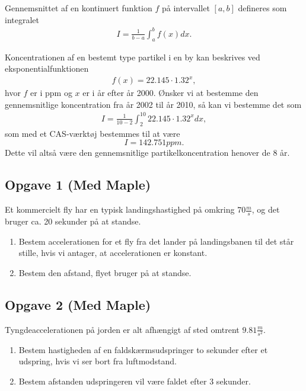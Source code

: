 \begin{defn}
Gennemsnittet af en kontinuert funktion $f$ på intervallet $[a,b]$ defineres som integralet
\begin{align*}
I = \frac{1}{b-a}\int_a^bf(x)dx.
\end{align*}
\end{defn}

\begin{exa}
Koncentrationen af en bestemt type partikel i en by kan beskrives ved eksponentialfunktionen
\begin{align*}
f(x) = 22.145\cdot 1.32^x,
\end{align*}
hvor $f$ er i ppm og $x$ er i år efter år 2000. Ønsker vi at bestemme den gennemsnitlige koncentration fra år 2002 til år 2010, så kan vi bestemme det som
\begin{align*}
I = \frac{1}{10-2}\int_2^{10}22.145\cdot 1.32^x dx, 
\end{align*}
som med et CAS-værktøj bestemmes til at være
$$I = 142.751 ppm.$$
Dette vil altså være den gennemsnitlige partikelkoncentration henover de 8 år.
\end{exa}

\subsection*{Opgave 1 (Med Maple)}

Et kommercielt fly har en typisk landingshastighed på omkring $70 \frac{m}{s}$, og det bruger ca. 20 sekunder på at standse.

\begin{enumerate}[label=\roman*)]
	\item Bestem accelerationen for et fly fra det lander på landingsbanen til det står stille, hvis vi antager, at 
	accelerationen er konstant. 
	\item Bestem den afstand, flyet bruger på at standse. 
\end{enumerate}

\subsection*{Opgave 2 (Med Maple)}

Tyngdeaccelerationen på jorden er alt afhængigt af sted omtrent $9.81\frac{m}{s^2}$. 
\begin{enumerate}[label=\roman*)]
	\item Bestem hastigheden af en faldskærmsudspringer to sekunder efter et udspring, hvis vi ser bort fra luftmodstand.
	\item Bestem afstanden udspringeren vil være faldet efter 3 sekunder. 
\end{enumerate}

